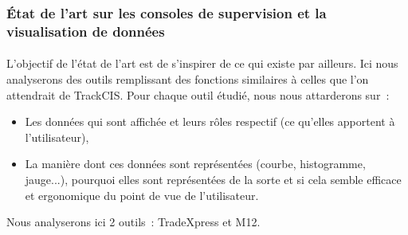 		\subsubsection{État de l'art sur les consoles de supervision et la visualisation de données}
			\paragraph{}
			L'objectif de l'état de l'art est de s'inspirer de ce qui existe par
			ailleurs.
			Ici nous analyserons des outils remplissant des
			fonctions similaires à celles que l’on attendrait de TrackCIS. Pour chaque
			outil étudié, nous nous attarderons sur~:
			\begin{itemize}
			  \item Les données qui sont affichée et leurs rôles respectif (ce qu'elles
			  apportent à l'utilisateur),
			  \item La manière dont ces données sont représentées (courbe, histogramme,
			  jauge...), pourquoi elles sont représentées de la sorte et si cela semble
			  efficace et ergonomique du point de vue de l’utilisateur.
			\end{itemize}
			Nous analyserons ici 2 outils~: TradeXpress et M12.
			
